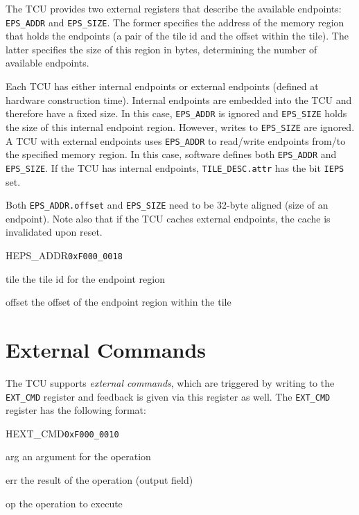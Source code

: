 The TCU provides two external registers that describe the available endpoints: \texttt{EPS\_ADDR}
and \texttt{EPS\_SIZE}. The former specifies the address of the memory region that holds the
endpoints (a pair of the tile id and the offset within the tile). The latter specifies the size of
this region in bytes, determining the number of available endpoints.

Each TCU has either internal endpoints or external endpoints (defined at hardware construction
time). Internal endpoints are embedded into the TCU and therefore have a fixed size. In this case,
\texttt{EPS\_ADDR} is ignored and \texttt{EPS\_SIZE} holds the size of this internal endpoint
region. However, writes to \texttt{EPS\_SIZE} are ignored. A TCU with external endpoints uses
\texttt{EPS\_ADDR} to read/write endpoints from/to the specified memory region. In this case,
software defines both \texttt{EPS\_ADDR} and \texttt{EPS\_SIZE}. If the TCU has internal endpoints,
\texttt{TILE\_DESC.attr} has the bit \texttt{IEPS} set.

Both \texttt{EPS\_ADDR.offset} and \texttt{EPS\_SIZE} need to be 32-byte aligned (size of an
endpoint). Note also that if the TCU caches external endpoints, the cache is invalidated upon reset.

\begin{register}{H}{EPS\_ADDR}{\texttt{0xF000\_0018}}
  \regnewline%
  \begin{regdesc}\begin{reglist}
    \item[tile] the tile id for the endpoint region
    \item[offset] the offset of the endpoint region within the tile
  \end{reglist}\end{regdesc}
\end{register}

\section{External Commands}

The TCU supports \emph{external commands}, which are triggered by writing to the \texttt{EXT\_CMD}
register and feedback is given via this register as well. The \texttt{EXT\_CMD} register has the
following format:

\begin{register}{H}{EXT\_CMD}{\texttt{0xF000\_0010}}
  \regnewline%
  \begin{regdesc}\begin{reglist}
    \item[arg] an argument for the operation
    \item[err] the result of the operation (output field)
    \item[op] the operation to execute
  \end{reglist}\end{regdesc}
\end{register}

